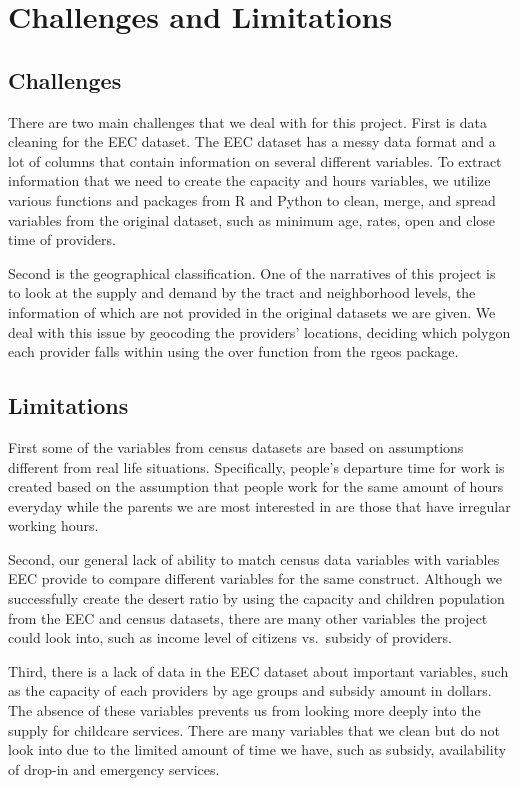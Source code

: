 \documentclass[10pt,letterpaper]{article}
\begin{document}
\section{Challenges and Limitations}\label{challenges-and-limitations}

\subsection{Challenges}\label{challenges}

There are two main challenges that we deal with for this project. First
is data cleaning for the EEC dataset. The EEC dataset has a messy data
format and a lot of columns that contain information on several
different variables. To extract information that we need to create the
capacity and hours variables, we utilize various functions and packages
from R and Python to clean, merge, and spread variables from the
original dataset, such as minimum age, rates, open and close time of
providers.

Second is the geographical classification. One of the narratives of this
project is to look at the supply and demand by the tract and
neighborhood levels, the information of which are not provided in the
original datasets we are given. We deal with this issue by geocoding the
providers' locations, deciding which polygon each provider falls within
using the over function from the rgeos package.

\subsection{Limitations}\label{limitations}

First some of the variables from census datasets are based on
assumptions different from real life situations. Specifically, people's
departure time for work is created based on the assumption that people
work for the same amount of hours everyday while the parents we are most
interested in are those that have irregular working hours.

Second, our general lack of ability to match census data variables with
variables EEC provide to compare different variables for the same
construct. Although we successfully create the desert ratio by using the
capacity and children population from the EEC and census datasets, there
are many other variables the project could look into, such as income
level of citizens vs.~subsidy of providers.

Third, there is a lack of data in the EEC dataset about important
variables, such as the capacity of each providers by age groups and
subsidy amount in dollars. The absence of these variables prevents us
from looking more deeply into the supply for childcare services. There
are many variables that we clean but do not look into due to the limited
amount of time we have, such as subsidy, availability of drop-in and
emergency services.
\end{document}
